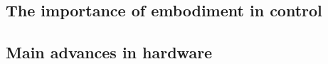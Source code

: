 
\subsection{The importance of embodiment in control} %
\label{sub:the_embodiment_}

\subsection{Main advances in hardware} %
\label{sub:the_advances_in_hardware}



